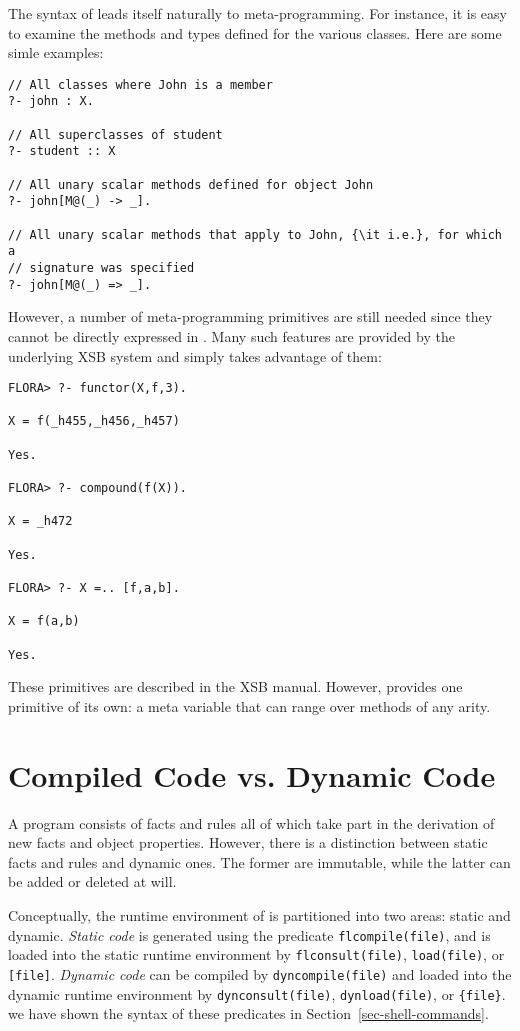 \documentclass[11pt]{report}
\begin{document}
The syntax of \fl leads itself naturally to meta-programming. For instance,
it is easy to examine the methods and types defined for the various classes.
Here are some simle examples:
\begin{verbatim}
// All classes where John is a member
?- john : X.  

// All superclasses of student
?- student :: X

// All unary scalar methods defined for object John
?- john[M@(_) -> _].

// All unary scalar methods that apply to John, {\it i.e.}, for which a
// signature was specified
?- john[M@(_) => _].
\end{verbatim}
However, a number of meta-programming primitives are still needed
since they cannot be directly expressed in \fl. Many such features are
provided by the underlying XSB system and \FLORA simply takes advantage of
them: 
\begin{verbatim}
FLORA> ?- functor(X,f,3).

X = f(_h455,_h456,_h457)

Yes.

FLORA> ?- compound(f(X)).

X = _h472

Yes.

FLORA> ?- X =.. [f,a,b].

X = f(a,b)

Yes.
\end{verbatim}
These primitives are described in the XSB manual. However, \FLORA provides
one primitive of its own: a meta variable that can range over methods of
any arity.


\section{Compiled Code vs. Dynamic Code}

A \FLORA program consists of facts and rules all of which take part in the
derivation of new facts and object properties.
However, there is a distinction between static facts and rules and dynamic
ones. The former are immutable, while the latter can be added or deleted at
will.

Conceptually, the runtime environment of \FLORA is partitioned into two
areas: static and dynamic. \emph{Static code} is generated using the
predicate {\tt flcompile(file)}, and is loaded into the static runtime
environment by {\tt flconsult(file)}, {\tt load(file)}, or {\tt [file]}.
\emph{Dynamic code} can be compiled by {\tt dyncompile(file)} and loaded
into the dynamic runtime environment by {\tt dynconsult(file)},
{\tt dynload(file)}, or \texttt{\{file\}}.  we have shown the syntax of
these predicates in Section~\ref{sec-shell-commands}.
\end{document}
